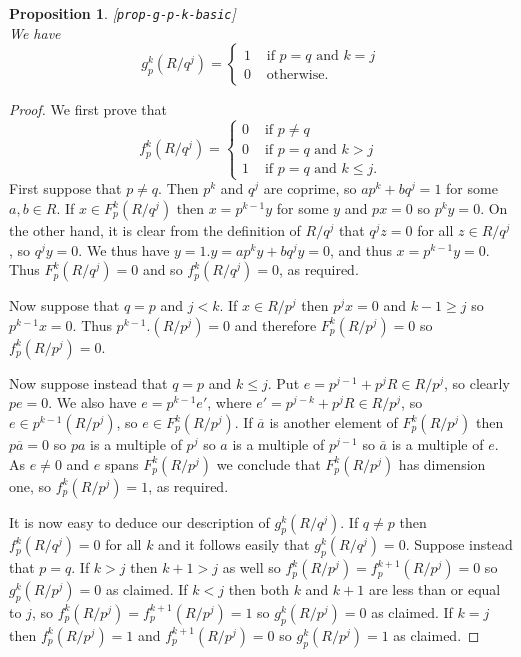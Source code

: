 \documentclass{amsart}
\newcommand{\lbl}[1]{\label{#1}\textup{[\texttt{#1}]}\ \\}
\newcommand{\lbl}{\label}
\newcommand{\ov}[1]     {\overline{#1}}
\renewcommand{\:}{\colon}
\newtheorem{proposition}[theorem]{Proposition}
\theoremstyle{definition}
\begin{document}
\begin{proposition}\lbl{prop-g-p-k-basic}
 We have 
 \[ g_p^k(R/q^j) = \begin{cases}
     1 & \text{ if } p=q \text{ and } k=j \\
     0 & \text{ otherwise. }
 \end{cases} \]
\end{proposition}
\begin{proof}
 We first prove that
 \[ f_p^k(R/q^j) = \begin{cases}
     0 & \text{ if } p\neq q \\
     0 & \text{ if } p=q \text{ and } k>j \\
     1 & \text{ if } p=q \text{ and } k\leq j.
 \end{cases} \]
 First suppose that $p\neq q$.  Then $p^k$ and $q^j$ are coprime, so
 $ap^k+bq^j=1$ for some $a,b\in R$.  If $x\in F_p^k(R/q^j)$ then
 $x=p^{k-1}y$ for some $y$ and $px=0$ so $p^ky=0$.  On the other hand,
 it is clear from the definition of $R/q^j$ that $q^jz=0$ for all
 $z\in R/q^j$, so $q^jy=0$.  We thus have $y=1.y=ap^ky+bq^jy=0$, and
 thus $x=p^{k-1}y=0$.  Thus $F_p^k(R/q^j)=0$ and so $f_p^k(R/q^j)=0$,
 as required.

 Now suppose that $q=p$ and $j<k$.  If $x\in R/p^j$ then $p^jx=0$ and
 $k-1\geq j$ so $p^{k-1}x=0$.  Thus $p^{k-1}.(R/p^j)=0$ and therefore
 $F_p^k(R/p^j)=0$ so $f_p^k(R/p^j)=0$.

 Now suppose instead that $q=p$ and $k\leq j$.  Put $e=p^{j-1}+p^jR\in
 R/p^j$, so clearly $pe=0$.  We also have $e=p^{k-1}e'$, where
 $e'=p^{j-k}+p^jR\in R/p^j$, so $e\in p^{k-1}(R/p^j)$, so
 $e\in F_p^k(R/p^j)$.  If $\ov{a}$ is another element of
 $F_p^k(R/p^j)$ then $p\ov{a}=0$ so $pa$ is a multiple of $p^j$ so $a$
 is a multiple of $p^{j-1}$ so $\ov{a}$ is a multiple of $e$.  As
 $e\neq 0$ and $e$ spans $F_p^k(R/p^j)$ we conclude that
 $F_p^k(R/p^j)$ has dimension one, so $f_p^k(R/p^j)=1$, as required.

 It is now easy to deduce our description of $g_p^k(R/q^j)$.  If
 $q\neq p$ then $f_p^k(R/q^j)=0$ for all $k$ and it follows easily
 that $g_p^k(R/q^j)=0$.  Suppose instead that $p=q$.  If $k>j$ then
 $k+1>j$ as well so $f_p^k(R/p^j)=f_p^{k+1}(R/p^j)=0$ so
 $g_p^k(R/p^j)=0$ as claimed.  If $k<j$ then both $k$ and $k+1$ are
 less than or equal to $j$, so $f_p^k(R/p^j)=f_p^{k+1}(R/p^j)=1$ so
 $g_p^k(R/p^j)=0$ as claimed.  If $k=j$ then $f_p^k(R/p^j)=1$ and
 $f_p^{k+1}(R/p^j)=0$ so $g_p^k(R/p^j)=1$ as claimed.
\end{proof}
\end{document}
